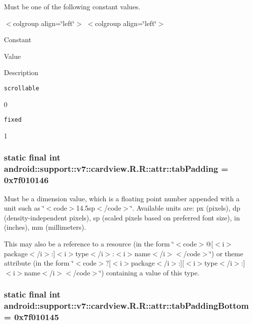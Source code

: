 Must be one of the following constant values. \begin{TabularC}{0}
\hline
\end{TabularC}
$<$colgroup align=\char`\"{}left\char`\"{}$>$ $<$colgroup align=\char`\"{}left\char`\"{}$>$ 

Constant

Value

Description 

{\tt scrollable}

0

{\tt fixed}

1\hypertarget{classandroid_1_1support_1_1v7_1_1cardview_1_1_r_1_1attr_2e7ad785d084b036d3a2ab86dcac8733}{
\subsubsection[{tabPadding}]{\setlength{\rightskip}{0pt plus 5cm}static final int android::support::v7::cardview.R.R::attr::tabPadding = 0x7f010146}}
\label{classandroid_1_1support_1_1v7_1_1cardview_1_1_r_1_1attr_2e7ad785d084b036d3a2ab86dcac8733}


Must be a dimension value, which is a floating point number appended with a unit such as \char`\"{}$<$code$>$14.5sp$<$/code$>$\char`\"{}. Available units are: px (pixels), dp (density-independent pixels), sp (scaled pixels based on preferred font size), in (inches), mm (millimeters). 

This may also be a reference to a resource (in the form \char`\"{}$<$code$>$@\mbox{[}$<$i$>$package$<$/i$>$:\mbox{]}$<$i$>$type$<$/i$>$:$<$i$>$name$<$/i$>$$<$/code$>$\char`\"{}) or theme attribute (in the form \char`\"{}$<$code$>$?\mbox{[}$<$i$>$package$<$/i$>$:\mbox{]}\mbox{[}$<$i$>$type$<$/i$>$:\mbox{]}$<$i$>$name$<$/i$>$$<$/code$>$\char`\"{}) containing a value of this type. \hypertarget{classandroid_1_1support_1_1v7_1_1cardview_1_1_r_1_1attr_1d91fc5b23b7e6327ce3f8cbabbd9699}{
\subsubsection[{tabPaddingBottom}]{\setlength{\rightskip}{0pt plus 5cm}static final int android::support::v7::cardview.R.R::attr::tabPaddingBottom = 0x7f010145}}
\label{classandroid_1_1support_1_1v7_1_1cardview_1_1_r_1_1attr_1d91fc5b23b7e6327ce3f8cbabbd9699}


